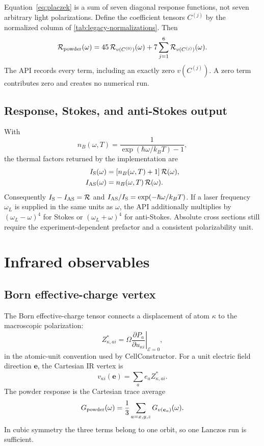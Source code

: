 \documentclass[11pt,a4paper]{article}
\begin{document}
Equation~\eqref{eq:placzek} is a sum of seven diagonal response functions,
not seven arbitrary light polarizations.  Define the coefficient tensors
$C^{(j)}$ by the normalized column of
\cref{tab:legacy-normalizations}.  Then
\begin{equation}
  \mathcal R_{\rm powder}(\omega)=
  45\,\mathcal R_{v(C^{(0)})}(\omega)
  +7\sum_{j=1}^{6}\mathcal R_{v(C^{(j)})}(\omega).
  \label{eq:powder-response}
\end{equation}
The API records every term, including an exactly zero $v(C^{(j)})$.  A zero
term contributes zero and creates no numerical run.

\subsection{Response, Stokes, and anti-Stokes output}

With
\begin{equation}
  n_B(\omega,T)=\frac{1}{\exp(\hbar\omega/k_BT)-1},
\end{equation}
the thermal factors returned by the implementation are
\begin{align}
  I_{\rm S}(\omega)&=[n_B(\omega,T)+1]\,\mathcal R(\omega),\\
  I_{\rm AS}(\omega)&=n_B(\omega,T)\,\mathcal R(\omega).
\end{align}
Consequently $I_{\rm S}-I_{\rm AS}=\mathcal R$ and
$I_{\rm AS}/I_{\rm S}=\exp(-\hbar\omega/k_BT)$.
If a laser frequency $\omega_L$ is supplied in the same units as $\omega$,
the API additionally multiplies by $(\omega_L-\omega)^4$ for Stokes or
$(\omega_L+\omega)^4$ for anti-Stokes.  Absolute cross sections still require
the experiment-dependent prefactor and a consistent polarizability unit.

\section{Infrared observables}
\label{sec:ir}

\subsection{Born effective-charge vertex}

The Born effective-charge tensor connects a displacement of atom $\kappa$ to
the macroscopic polarization:
\begin{equation}
  Z^*_{\kappa,ai}=\Omega\left.
  \frac{\partial P_a}{\partial u_{\kappa i}}\right|_{\bm{\mathcal E}=0},
  \label{eq:born-charge}
\end{equation}
in the atomic-unit convention used by CellConstructor.  For a unit electric
field direction $\bm e$, the Cartesian IR vertex is
\begin{equation}
  v_{\kappa i}(\bm e)=\sum_a e_a Z^*_{\kappa,ai}.
  \label{eq:ir-vertex}
\end{equation}
The powder response is the Cartesian trace average
\begin{equation}
  G_{\rm powder}(\omega)=\frac13\sum_{a=x,y,z}G_{v(\bm e_a)}(\omega).
  \label{eq:ir-powder}
\end{equation}
In cubic symmetry the three terms belong to one orbit, so one Lanczos run is
sufficient.
\end{document}
